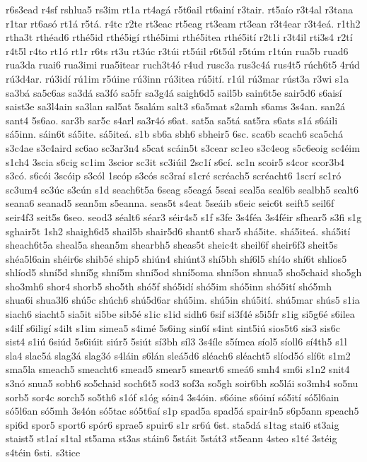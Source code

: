 {r6s3ead
r4sf
rshlua5
rs3im
rt1a
rt4agá
r5t6ail
rt6ainí
r3tair.
rt5aío
r3t4al
r3tana
r1tar
rt6asó
rt1á
r5tá.
r4tc
r2te
rt3eac
rt5eag
rt3eam
rt3ean
r3t4ear
r3t4eá.
r1th2
rtha3t
rthéad6
rthé5id
rthé5igí
rthé5imi
rthé5itea
rthé5ití
r2t1i
r3t4il
rti3s4
r2tí
r4t5l
r4to
rt1ó
rt1r
r6ts
rt3u
rt3úc
r3túi
rt5úil
r6t5úl
r5túm
r1tún
rua5b
ruad6
rua3da
ruai6
rua3imi
rua5itear
ruch3t4ó
r4ud
rusc3a
rus3c4á
rus4t5
rúch6t5
4rúd
rú3d4ar.
rú3idí
rú1im
r5úine
rú3inn
rú3itea
rú5ití.
r1úl
rú3mar
rúst3a
r3wi
s1a
sa3bá
sa5c6as
sa3dá
sa3fó
sa5fr
sa3g4á
saigh6d5
sail5b
sain6t5e
sair5d6
s6aisí
saist3e
sa3l4ain
sa3lan
sal5at
5salám
salt3
s6a5mat
s2amh
s6ams
3s4an.
san2á
sant4
5s6ao.
sar3b
sar5c
s4arl
sa3r4ó
s6at.
sat5a
sa5tá
sat5ra
s6ats
s1á
s6áili
sá5inn.
sáin6t
sá5ite.
sá5iteá.
s1b
sb6a
sbh6
sbheir5
6sc.
sca6b
scach6
sca5chá
s3c4ae
s3c4aird
sc6ao
sc3ar3n4
s5cat
scáin5t
s3cear
sc1eo
s3c4eog
s5c6eoig
sc4éim
s1ch4
3scia
s6cig
sc1im
3scior
sc3it
sc3iúil
2sc1í
s6cí.
sc1n
scoir5
s4cor
scor3b4
s3có.
s6cói
3scóip
s3cól
1scóp
s3cós
sc3raí
s1cré
scréach5
scréacht6
1scrí
sc1ró
sc3um4
sc3úc
s3cún
s1d
seach6t5a
6seag
s5eagá
5seai
seal5a
seal6b
sealbh5
sealt6
seana6
seanad5
sean5m
s5eanna.
seas5t
s4eat
5seáib
s6eic
seic6t
seift5
seil6f
seir4f3
seit5s
6seo.
seod3
séalt6
séar3
séir4s5
s1f
s3fe
3s4féa
3s4féir
sfhear5
s3fi
s1g
sghair5t
1sh2
shaigh6d5
shail5b
shair5d6
shant6
shar5
shá5ite.
shá5iteá.
shá5ití
sheach6t5a
sheal5a
shean5m
shearbh5
sheas5t
sheic4t
sheil6f
sheir6f3
sheit5s
shéa5l6ain
shéir6s
shib5é
ship5
shiún4
shiúnt3
shí5bh
shí6l5
shí4o
shí6t
shlios5
shlíod5
shní5d
shní5g
shní5m
shní5od
shní5oma
shní5on
shnua5
sho5chaid
sho5gh
sho3mh6
shor4
shorb5
sho5th
shó5f
shó5idí
shó5im
shó5inn
shó5ití
shó5mh
shua6i
shua3l6
shú5c
shúch6
shú5d6ar
shú5im.
shú5in
shú5ití.
shú5mar
shús5
s1ia
siach6
siacht5
sia5it
si5be
sib5é
s1ic
s1id
sidh6
6sif
si3f4é
s5i5fr
s1ig
si5g6é
s6ilea
s4ilf
s6iligí
s4ilt
s1im
simea5
s4imé
5s6ing
sin6í
s4int
sint5iú
sios5t6
sis3
sis6c
sist4
s1iú
6siúd
5s6iúit
siúr5
5siút
sí3bh
síl3
3s4íle
s5ímea
síol5
síoll6
sí4th5
s1l
sla4
slac5á
slag3á
slag3ó
s4láin
s6lán
sleá5d6
sléach6
sléacht5
slíod5ó
slí6t
s1m2
sma5la
smeach5
smeacht6
smead5
smear5
smeart6
smeá6
smh4
sm6i
s1n2
snit4
s3nó
snua5
sobh6
so5chaid
soch6t5
sod3
sof3a
so5gh
soir6bh
so5lái
so3mh4
so5nu
sorb5
sor4c
sorch5
so5th6
s1óf
s1óg
sóin4
3s4óin.
s6óine
s6óiní
só5ití
só5l6ain
só5l6an
só5mh
3s4ón
só5tac
só5t6aí
s1p
spad5a
spad5á
spair4n5
s6p5ann
speach5
spi6d
spor5
sport6
spór6
sprae5
spuir6
s1r
sr6ú
6st.
sta5dá
s1tag
stai6
st3aig
staist5
st1aí
s1tal
st5ama
st3as
stáin6
5stáit
5stát3
st5eann
4steo
s1té
3stéig
s4téin
6sti.
s3tice
}
